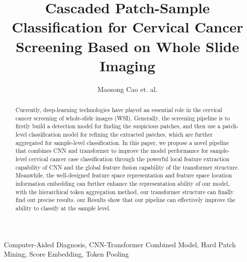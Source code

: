 \documentclass[journal,twoside,web]{ieeecolor}
\newcommand{\rv}[1]{\textcolor{black}{#1}}
\begin{document}
\title{Cascaded Patch-Sample Classification for Cervical Cancer Screening Based on Whole Slide Imaging}
\author{Maosong Cao et. al.
}

\maketitle

\begin{abstract}
    Currently, deep-learning technologies have played an essential role in the cervical cancer screening of whole-slide images (WSI). Generally, the screening pipeline is to firstly build a detection model for finding the suspicious patches, and then use a patch-level classification model for refining the extracted patches, which are further aggregated for sample-level classification. In this paper, we propose a novel pipeline that combines CNN and transformer to improve the model performance for sample-level cervical cancer case classification through the powerful local feature extraction capability of CNN and the global feature fusion capability of the transformer structure. Meanwhile, the well-designed feature space representation and feature space location information embedding can further enhance the representation ability of our model, with the hierarchical token aggregation method, our transformer structure can finally find out precise results. our Results show that our pipeline can effectively improve the ability to classify at the sample level. 
\end{abstract}

\begin{IEEEkeywords}
Computer\rv{-}Aided Diagnosis, CNN\rv{-}Transformer Combined Model, Hard Patch Mining, Score Embedding, Token Pooling
\end{IEEEkeywords}
\end{document}
